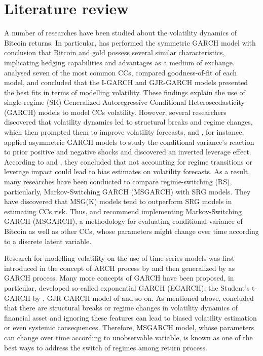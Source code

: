 \documentclass[12pt,a4paper]{article}
\begin{document}
\section{Literature review}
A number of researches have been studied about the volatility dynamics of Bitcoin returns. In particular, \cite{dyhrberg2016bitcoin} has performed the symmetric GARCH model with conclusion that Bitcoin and gold possess several similar characteristics, implicating hedging capabilities and advantages as a medium of exchange. \cite{chu2017garch} analysed seven of the most common CCs, compared goodness-of-fit of each model, and concluded that the I-GARCH and GJR-GARCH models presented the best fits in terms of modelling volatility. These findings explain the use of single-regime (SR) Generalized Autoregressive Conditional Heteroscedasticity (GARCH) models to model CCs volatility. However, several researchers discovered that volatility dynamics led to structural breaks and regime changes, which then prompted them to improve volatility forecasts. \cite{bouri2017return} and \cite{katsiampa2017volatility}, for instance, applied asymmetric GARCH models to study the conditional variance’s reaction to prior positive and negative shocks and discovered an inverted leverage effect. According to \cite{haas2004new} and \cite{bauwens2014marginal}, they concluded that not accounting for regime transitions or leverage impact could lead to bias estimates on volatility forecasts. As a result, many researches have been conducted to compare regime-switching (RS), particularly, Markov-Switching GARCH (MSGARCH) with SRG models. They have discovered that MSG(K) models tend to outperform SRG models in estimating CCs risk. Thus, \cite{ardia2019regime} and \cite{caporale2019modelling} recommend implementing Markov-Switching GARCH (MSGARCH), a methodology for evaluating conditional variance of Bitcoin as well as other CCs, whose parameters might change over time according to a discrete latent variable.\par 

Research for modelling volatility on the use of time-series models was first introduced in the concept of ARCH process by\cite{engle1982autoregressive} and then generalized by \cite{bollerslev1986generalized} as GARCH process. Many more concepts of GARCH have been proposed, in particular, \citep{nelson1991conditional} developed so-called exponential GARCH (EGARCH), the Student’s t-GARCH by \cite{bollerslev1987conditionally}, GJR-GARCH model of \cite{glosten1993relation} and so on. As mentioned above, \cite{bauwens2014marginal}concluded that there are structural breaks or regime changes in volatility dynamics of financial asset and ignoring these features can lead to biased volatility estimation or even systemic consequences. Therefore, MSGARCH model, whose parameters can change over time according to unobservable variable, is known as one of the best ways to address the switch of regimes among return process.\par 
\end{document}
